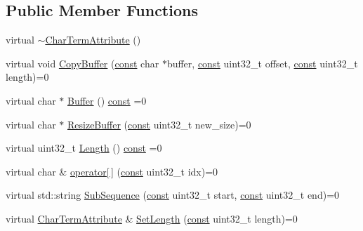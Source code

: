 \subsection*{Public Member Functions}
\begin{DoxyCompactItemize}
\item 
virtual \mbox{\hyperlink{classlucene_1_1core_1_1analysis_1_1tokenattributes_1_1CharTermAttribute_a44922cdddac47f06e60c0e69c78599ad}{$\sim$\+Char\+Term\+Attribute}} ()
\item 
virtual void \mbox{\hyperlink{classlucene_1_1core_1_1analysis_1_1tokenattributes_1_1CharTermAttribute_ae03cbeb05b5b1e7c50f407e0025d41da}{Copy\+Buffer}} (\mbox{\hyperlink{ZlibCrc32_8h_a2c212835823e3c54a8ab6d95c652660e}{const}} char $\ast$buffer, \mbox{\hyperlink{ZlibCrc32_8h_a2c212835823e3c54a8ab6d95c652660e}{const}} uint32\+\_\+t offset, \mbox{\hyperlink{ZlibCrc32_8h_a2c212835823e3c54a8ab6d95c652660e}{const}} uint32\+\_\+t length)=0
\item 
virtual char $\ast$ \mbox{\hyperlink{classlucene_1_1core_1_1analysis_1_1tokenattributes_1_1CharTermAttribute_abc9fbea4b68b4cdbb1d120970c71d38e}{Buffer}} () \mbox{\hyperlink{ZlibCrc32_8h_a2c212835823e3c54a8ab6d95c652660e}{const}} =0
\item 
virtual char $\ast$ \mbox{\hyperlink{classlucene_1_1core_1_1analysis_1_1tokenattributes_1_1CharTermAttribute_ada68e9c9011b5ac61e9a34caf63aba6d}{Resize\+Buffer}} (\mbox{\hyperlink{ZlibCrc32_8h_a2c212835823e3c54a8ab6d95c652660e}{const}} uint32\+\_\+t new\+\_\+size)=0
\item 
virtual uint32\+\_\+t \mbox{\hyperlink{classlucene_1_1core_1_1analysis_1_1tokenattributes_1_1CharTermAttribute_a1e81ad4ff6bc6141f5a6e103cdf7f36d}{Length}} () \mbox{\hyperlink{ZlibCrc32_8h_a2c212835823e3c54a8ab6d95c652660e}{const}} =0
\item 
virtual char \& \mbox{\hyperlink{classlucene_1_1core_1_1analysis_1_1tokenattributes_1_1CharTermAttribute_af6a554c50515313093c1ac61c3bddbe7}{operator\mbox{[}$\,$\mbox{]}}} (\mbox{\hyperlink{ZlibCrc32_8h_a2c212835823e3c54a8ab6d95c652660e}{const}} uint32\+\_\+t idx)=0
\item 
virtual std\+::string \mbox{\hyperlink{classlucene_1_1core_1_1analysis_1_1tokenattributes_1_1CharTermAttribute_af97534d3a549afbbddd5f64b97efc5a4}{Sub\+Sequence}} (\mbox{\hyperlink{ZlibCrc32_8h_a2c212835823e3c54a8ab6d95c652660e}{const}} uint32\+\_\+t start, \mbox{\hyperlink{ZlibCrc32_8h_a2c212835823e3c54a8ab6d95c652660e}{const}} uint32\+\_\+t end)=0
\item 
virtual \mbox{\hyperlink{classlucene_1_1core_1_1analysis_1_1tokenattributes_1_1CharTermAttribute}{Char\+Term\+Attribute}} \& \mbox{\hyperlink{classlucene_1_1core_1_1analysis_1_1tokenattributes_1_1CharTermAttribute_a8186262029561e196e991fc543cd9953}{Set\+Length}} (\mbox{\hyperlink{ZlibCrc32_8h_a2c212835823e3c54a8ab6d95c652660e}{const}} uint32\+\_\+t length)=0

\end{DoxyCompactItemize}
